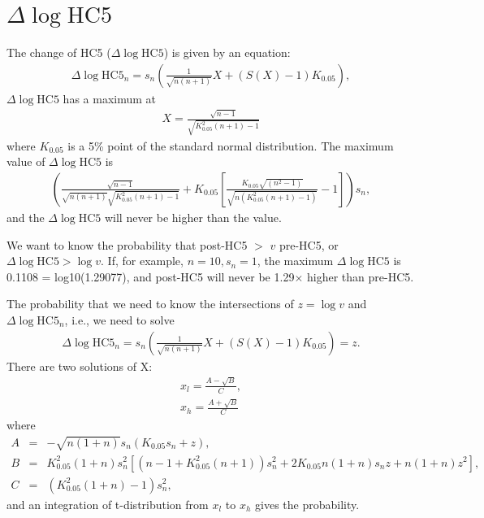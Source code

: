 \documentclass[10pt]{article}
\begin{document}
\section{$\Delta \log\mathrm{HC}5$}
The change of HC5 ($\Delta \log\mathrm{HC}5$) is given by an equation:
\begin{eqnarray}
\nonumber
\Delta \log\mathrm{HC5}_n = s_n\left( \frac{1}{\sqrt{n(n+1)}}X  + \left(S(X)-1 \right)K_{0.05} \right),
\end{eqnarray}
$\Delta \log\mathrm{HC}5$ has a maximum at 
\begin{eqnarray}
\nonumber
X = \frac{\sqrt{n-1}}{\sqrt{K_{0.05}^2(n+1)-1}}
\end{eqnarray}
where $K_{0.05}$ is a 5\% point of the standard normal distribution. The maximum value of $\Delta \log\mathrm{HC5}$ is
\begin{eqnarray}
\nonumber
\left( \frac{\sqrt{n-1}}{\sqrt{n(n+1)}\sqrt{K_{0.05}^2(n+1)-1}}+K_{0.05}\left[   \frac{K_{0.05}\sqrt{(n^2-1)}}{\sqrt{n(K_{0.05}^2(n+1)-1)}} -1        \right] \right)s_n,
\end{eqnarray}
and the $\Delta \log\mathrm{HC5}$ will never be higher than the value. 

We want to know the probability that post-HC5 $>$ $v$ pre-HC5, or $\Delta\log\mathrm{HC5} > \log v$. If, for example, $n=10, s_n = 1$,  the maximum $\Delta\log\mathrm{HC5}$ is 0.1108 = log10(1.29077), and post-HC5 will never be 1.29$\times$ higher than pre-HC5. 

The probability that we need to know the intersections of $z = \log v$ and $\Delta \log\mathrm{HC5}_n$, i.e., we need to solve
\begin{eqnarray}
\nonumber
\Delta \log\mathrm{HC5}_n = s_n\left( \frac{1}{\sqrt{n(n+1)}}X  + \left(S(X)-1 \right)K_{0.05} \right) = z.
\end{eqnarray}
There are two solutions of X: 
\begin{eqnarray*}
x_l = \frac{A - \sqrt{B}}{C}, \\
x_h = \frac{A + \sqrt{B}}{C}
\end{eqnarray*}
where
\begin{eqnarray*}
A &=& -\sqrt{n(1+n)} s_n (K_{0.05} s_n + z), \\
B &=&  K_{0.05}^2(1+n)s_n^2\left[  (n-1+K_{0.05}^2(n+1))s_n^2 + 2 K_{0.05} n(1+n)s_n z + n(1+n)z^2              \right], \\
C &=& (K_{0.05}^2(1+n)-1) s_n^2,
\end{eqnarray*}
and an integration of t-distribution from $x_l$ to $x_h$ gives the probability. 
\end{document}

